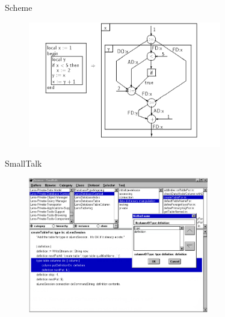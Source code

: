 \documentclass[xcolor=dvipsnames, 14pt]{beamer}
\begin{document}
\begin{frame}{Scheme}
    \begin{figure}[htbp]
      \centering
      \includegraphics[width=0.75\textwidth]{img/griswold.png}
      \label{fig:Scheme}
    \end{figure}
\end{frame}

\begin{frame}{SmallTalk}
  \begin{figure}[htbp]
    \centering
    \includegraphics[width=0.7\textwidth]{img/smalltalk.png}
    \label{fig:Smalltalk}
  \end{figure}
\end{frame}
\end{document}
